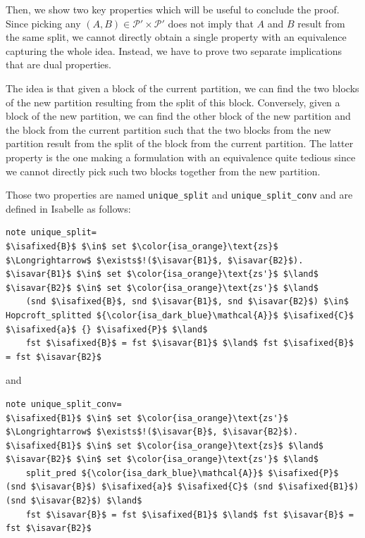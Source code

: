 \documentclass[12pt, a4 paper]{article}
\newcommand{\isavar}[1]{{\color{isa_dark_green}\text{#1}}}
\newcommand{\isafixed}[1]{{\color{isa_dark_blue}\text{#1}}}
\theoremstyle{definition}
\begin{document}
\bigskip

Then, we show two key properties which will be useful to conclude the proof.
Since picking any $(A, B) \in \mathcal{P'} \times \mathcal{P'}$ does not imply that $A$ and $B$ result from the same split, we cannot directly obtain a single property with an equivalence capturing the whole idea.
Instead, we have to prove two separate implications that are dual properties.

The idea is that given a block of the current partition, we can find the two blocks of the new partition resulting from the split of this block.
Conversely, given a block of the new partition, we can find the other block of the new partition and the block from the current partition such that the two blocks from the new partition result from the split of the block from the current partition.
The latter property is the one making a formulation with an equivalence quite tedious since we cannot directly pick such two blocks together from the new partition.

Those two properties are named \texttt{unique\_split} and \texttt{unique\_split\_conv} and are defined in Isabelle as follows:
\begin{lstlisting}[language=Isabelle]
note unique_split=
$\isafixed{B}$ $\in$ set $\color{isa_orange}\text{zs}$ $\Longrightarrow$ $\exists$!($\isavar{B1}$, $\isavar{B2}$). $\isavar{B1}$ $\in$ set $\color{isa_orange}\text{zs'}$ $\land$ $\isavar{B2}$ $\in$ set $\color{isa_orange}\text{zs'}$ $\land$
    (snd $\isafixed{B}$, snd $\isavar{B1}$, snd $\isavar{B2}$) $\in$ Hopcroft_splitted ${\color{isa_dark_blue}\mathcal{A}}$ $\isafixed{C}$ $\isafixed{a}$ {} $\isafixed{P}$ $\land$
    fst $\isafixed{B}$ = fst $\isavar{B1}$ $\land$ fst $\isafixed{B}$ = fst $\isavar{B2}$
\end{lstlisting}
and
\begin{lstlisting}[language=Isabelle]
note unique_split_conv=
$\isafixed{B1}$ $\in$ set $\color{isa_orange}\text{zs'}$ $\Longrightarrow$ $\exists$!($\isavar{B}$, $\isavar{B2}$). $\isafixed{B1}$ $\in$ set $\color{isa_orange}\text{zs}$ $\land$ $\isavar{B2}$ $\in$ set $\color{isa_orange}\text{zs'}$ $\land$
    split_pred ${\color{isa_dark_blue}\mathcal{A}}$ $\isafixed{P}$ (snd $\isavar{B}$) $\isafixed{a}$ $\isafixed{C}$ (snd $\isafixed{B1}$) (snd $\isavar{B2}$) $\land$
    fst $\isavar{B}$ = fst $\isafixed{B1}$ $\land$ fst $\isavar{B}$ = fst $\isavar{B2}$
\end{lstlisting}
\end{document}
